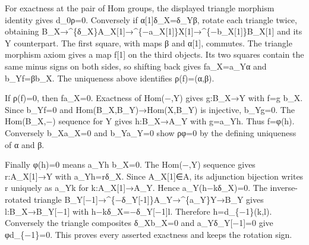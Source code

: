 For exactness at the pair of Hom groups,\allowbreak{} the displayed triangle morphism identity gives d\_\allowbreak{}0ρ\allowbreak{}=0. Conversely if α[1]\allowbreak{}δ\_\allowbreak{}X\allowbreak{}=δ\_\allowbreak{}Yβ,\allowbreak{} rotate each triangle twice,\allowbreak{} obtaining B\_\allowbreak{}X\allowbreak{}→\textasciicircum{}\{δ\_\allowbreak{}X\}A\_\allowbreak{}X[1]\allowbreak{}\allowbreak{}→\textasciicircum{}\{−a\_\allowbreak{}X[1]\allowbreak{}\}X[1]\allowbreak{}\allowbreak{}→\textasciicircum{}\{−b\_\allowbreak{}X[1]\allowbreak{}\}B\_\allowbreak{}X[1]\allowbreak{} and its Y counterpart. The first square,\allowbreak{} with maps β and α[1]\allowbreak{},\allowbreak{} commutes. The triangle morphism axiom gives a map f[1]\allowbreak{} on the third objects. Its two squares contain the same minus signs on both sides,\allowbreak{} so shifting back gives fa\_\allowbreak{}X\allowbreak{}=a\_\allowbreak{}Yα and b\_\allowbreak{}Yf\allowbreak{}=βb\_\allowbreak{}X. The uniqueness above identifies ρ(f)\allowbreak{}\allowbreak{}=(α,\allowbreak{}β)\allowbreak{}.

If ρ(f)\allowbreak{}\allowbreak{}=0,\allowbreak{} then fa\_\allowbreak{}X\allowbreak{}=0. Exactness of Hom(−,\allowbreak{}Y)\allowbreak{} gives g:\allowbreak{}B\_\allowbreak{}X\allowbreak{}→Y with f\allowbreak{}=g b\_\allowbreak{}X. Since b\_\allowbreak{}Yf\allowbreak{}=0 and Hom(B\_\allowbreak{}X,\allowbreak{}B\_\allowbreak{}Y)\allowbreak{}\allowbreak{}→Hom(X,\allowbreak{}B\_\allowbreak{}Y)\allowbreak{} is injective,\allowbreak{} b\_\allowbreak{}Yg\allowbreak{}=0. The Hom(B\_\allowbreak{}X,\allowbreak{}−)\allowbreak{} sequence for Y gives h:\allowbreak{}B\_\allowbreak{}X\allowbreak{}→A\_\allowbreak{}Y with g\allowbreak{}=a\_\allowbreak{}Yh. Thus f\allowbreak{}=φ(h)\allowbreak{}. Conversely b\_\allowbreak{}Xa\_\allowbreak{}X\allowbreak{}=0 and b\_\allowbreak{}Ya\_\allowbreak{}Y\allowbreak{}=0 show ρφ\allowbreak{}=0 by the defining uniqueness of α and β.

Finally φ(h)\allowbreak{}\allowbreak{}=0 means a\_\allowbreak{}Yh b\_\allowbreak{}X\allowbreak{}=0. The Hom(−,\allowbreak{}Y)\allowbreak{} sequence gives r:\allowbreak{}A\_\allowbreak{}X[1]\allowbreak{}\allowbreak{}→Y with a\_\allowbreak{}Yh\allowbreak{}=rδ\_\allowbreak{}X. Since A\_\allowbreak{}X[1]\allowbreak{}\allowbreak{}∈A,\allowbreak{} its adjunction bijection writes r uniquely as a\_\allowbreak{}Yk for k:\allowbreak{}A\_\allowbreak{}X[1]\allowbreak{}\allowbreak{}→A\_\allowbreak{}Y. Hence a\_\allowbreak{}Y(h−kδ\_\allowbreak{}X)\allowbreak{}\allowbreak{}=0. The inverse-rotated triangle B\_\allowbreak{}Y[−1]\allowbreak{}\allowbreak{}→\textasciicircum{}\{−δ\_\allowbreak{}Y[-1]\allowbreak{}\}A\_\allowbreak{}Y\allowbreak{}→\textasciicircum{}\{a\_\allowbreak{}Y\}Y\allowbreak{}→B\_\allowbreak{}Y gives l:\allowbreak{}B\_\allowbreak{}X\allowbreak{}→B\_\allowbreak{}Y[−1]\allowbreak{} with h−kδ\_\allowbreak{}X\allowbreak{}=−δ\_\allowbreak{}Y[−1]\allowbreak{}l. Therefore h\allowbreak{}=d\_\allowbreak{}\{−1\}(k,\allowbreak{}l)\allowbreak{}. Conversely the triangle composites δ\_\allowbreak{}Xb\_\allowbreak{}X\allowbreak{}=0 and a\_\allowbreak{}Yδ\_\allowbreak{}Y[−1]\allowbreak{}\allowbreak{}=0 give φd\_\allowbreak{}\{−1\}\allowbreak{}=0. This proves every asserted exactness and keeps the rotation sign.

